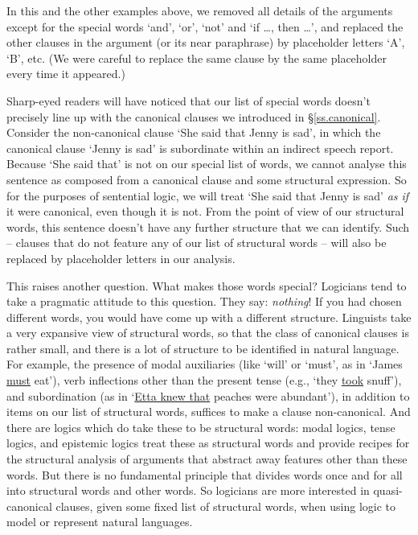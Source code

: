 In this and the other examples above, we removed all details of the arguments except for the special words `and', `or', `not' and `if …, then …', and replaced the other clauses in the argument (or its near paraphrase) by placeholder letters `A', `B', etc. (We were careful to replace the same clause by the same placeholder every time it appeared.)

Sharp-eyed readers will have noticed that our list of special words doesn't precisely line up with the canonical clauses we introduced in §\ref{ss.canonical}. Consider the non-canonical clause `She said that Jenny is sad', in which the canonical clause `Jenny is sad' is subordinate within an indirect speech report. Because `She said that' is not on our special list of words, we cannot analyse this sentence as composed from a canonical clause and some structural expression. So for the purposes of sentential logic, we will treat `She said that Jenny is sad' \emph{as if} it were canonical, even though it is not. From the point of view of our structural words, this sentence doesn't have any further structure that we can identify. Such  – clauses that do not feature any of our list of structural words – will also be replaced by placeholder letters in our analysis.


This raises another question. What makes those words special? Logicians tend to take a pragmatic attitude to this question. They say: \emph{nothing}! If you had chosen different words, you would have come up with a different structure. Linguists take a very expansive view of structural words, so that the class of canonical clauses is rather small, and there is a lot of structure to be identified in natural language. For example, the presence of modal auxiliaries (like `will' or `must', as in `James \underline{must} eat'), verb inflections other than the present tense (e.g., `they \underline{took} snuff'), and subordination (as in `\underline{Etta knew that} peaches were abundant'), in addition to items on our list of structural words, suffices to make a clause non-canonical. And there are logics which do take these to be structural words: modal logics, tense logics, and epistemic logics treat these as structural words and provide recipes for the structural analysis of arguments that abstract away features other than these words. But there is no fundamental principle that divides words once and for all into structural words and other words. So logicians are more interested in quasi-canonical clauses, given some fixed list of structural words, when using logic to model or represent natural languages. 

